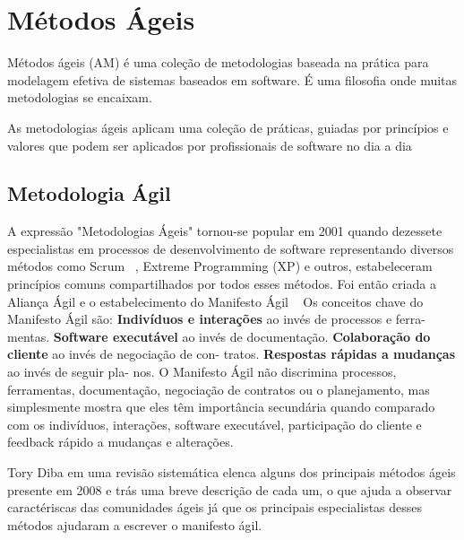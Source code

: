 \chapter{Métodos Ágeis}
\label{cap-metodos-ageis}

Métodos ágeis (AM) é uma coleção de metodologias baseada na prática para 
modelagem efetiva de sistemas baseados em software. É uma filosofia onde muitas metodologias se encaixam.

%
As metodologias ágeis aplicam uma coleção de práticas, guiadas por princípios e valores que podem ser aplicados por profissionais de software no dia a dia~\cite{}%

\section{Metodologia Ágil}
\label{metodologia-agil}

A expressão "Metodologias Ágeis" tornou-se popular em 2001 quando dezessete especialistas em processos de desenvolvimento de software representando diversos métodos como Scrum ~\cite{}, %
Extreme Programming (XP) e outros, estabeleceram princípios comuns compartilhados por todos esses métodos. Foi então criada a Aliança Ágil e o estabelecimento do Manifesto Ágil ~\cite{} %
Os conceitos chave do Manifesto Ágil são:
\textbf{Indivíduos e interações} ao invés de processos e ferra-
mentas.
\textbf{Software executável} ao invés de documentação.
\textbf{Colaboração do cliente} ao invés de negociação de con-
tratos.
\textbf{Respostas rápidas a mudanças} ao invés de seguir pla-
nos.
O Manifesto Ágil não discrimina processos, ferramentas, documentação, negociação de contratos ou o planejamento, mas simplesmente mostra que eles têm importância secundária quando comparado com os indivíduos, interações, software executável, participação do cliente e feedback rápido a mudanças e alterações.

%
Tory Diba em uma revisão sistemática elenca alguns dos principais métodos ágeis presente em 2008 e trás uma breve descrição de cada um, o que ajuda a observar caractériscas das comunidades ágeis já que os principais especialistas desses métodos ajudaram a escrever o manifesto ágil.\cite{}%

